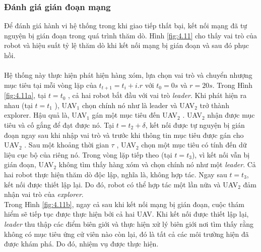 \documentclass[11pt,openany]{book}
\begin{document}
\subsubsection{Đánh giá gián đoạn mạng}
Để đánh giá hành vi hệ thống trong khi giao tiếp thất bại, kết nối mạng đã tự nguyện bị gián đoạn trong quá trình thăm dò. Hình \ref{fig:4.11} cho thấy vai trò của robot và hiệu suất tỷ lệ thăm dò khi kết nối mạng bị gián đoạn và sau đó phục hồi.\\\\
Hệ thống này thực hiện phát hiện hàng xóm, lựa chọn vai trò và chuyển nhượng mục tiêu tại mỗi vòng lặp của $t_{t+1}=t_i+i.r$ với $t_0=0s$ và $r=20s$. Trong Hình \ref{fig:4.11a}, tại $t=t_0$ , cả hai robot bắt đầu với vai trò \textit{leader}. Khi phát hiện ra nhau (tại $t=t_1$ ), UAV$_1$ chọn chính nó như là leader và UAV$_2$ trở thành explorer. Hậu quả là, UAV$_1$ gán một mục tiêu đến UAV$_2$ . UAV$_2$ nhận được mục tiêu và cố gắng để đạt được nó. Tại $t=t_2+\delta $, kết nối được tự nguyện bị gián đoạn ngay sau khi nhập vai trò và trước khi thông tin mục tiêu được gán cho UAV$_2$ . Sau một khoảng thời gian $\tau $ , UAV$_2$ chọn một mục tiêu có tính đến dữ liệu cục bộ của riêng nó. Trong vòng lặp tiếp theo (tại $t=t_3$), vì kết nối vẫn bị gián đoạn, UAV$_2$ không tìm thấy hàng xóm và chọn chính nó như một \textit{leader}. Cả hai robot thực hiện thăm dò độc lập, nghĩa là, không hợp tác. Ngay sau $t=t_3$, kết nối được thiết lập lại. Do đó, robot có thể hợp tác một lần nữa và UAV$_2$ đảm nhận vai trò của \textit{explorer}.\\
Trong Hình \ref{fig:4.11b}, ngay cả sau khi kết nối mạng bị gián đoạn, cuộc thám hiểm sẽ tiếp tục được thực hiện bởi cả hai UAV. Khi kết nối được thiết lập lại, \textit{leader} thu thập các điểm biên giới và thực hiện xử lý biên giới nơi tìm thấy rằng không có mục tiêu ứng cử viên nào còn lại, đó là tất cả các môi trường hiện đã được khám phá. Do đó, nhiệm vụ được thực hiện.
\end{document}

